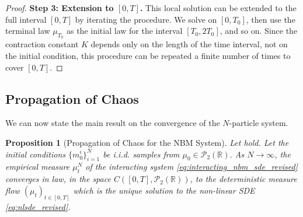 \documentclass[qian]{imsart}
\newcommand{\R}{\mathbb{R}}
\newcommand{\Pcal}{\mathcal{P}}
\theoremstyle{plain}
\newtheorem{proposition}[theorem]{Proposition}
\theoremstyle{definition}
\begin{document}
\begin{proof}
\textbf{Step 3: Extension to $[0,T]$.}
This local solution can be extended to the full interval $[0,T]$ by iterating the procedure. We solve on $[0, T_0]$, then use the terminal law $\mu_{T_0}$ as the initial law for the interval $[T_0, 2T_0]$, and so on. Since the contraction constant $K$ depends only on the length of the time interval, not on the initial condition, this procedure can be repeated a finite number of times to cover $[0,T]$.
\end{proof}

\subsection{Propagation of Chaos}

We can now state the main result on the convergence of the $N$-particle system.

\begin{proposition}[Propagation of Chaos for the NBM System]
\label{prop:propagation_of_chaos}
Let  hold. Let the initial conditions $\{m_0^i\}_{i=1}^N$ be i.i.d. samples from $\mu_0 \in \Pcal_2(\R)$. As $N \to \infty$, the empirical measure $\mu^N_t$ of the interacting system \eqref{eq:interacting_nbm_sde_revised} converges in law, in the space $C([0,T], \Pcal_2(\R))$, to the deterministic measure flow $(\mu_t)_{t\in[0,T]}$ which is the unique solution to the non-linear SDE \eqref{eq:nlsde_revised}.
\end{proposition}
\end{document}
